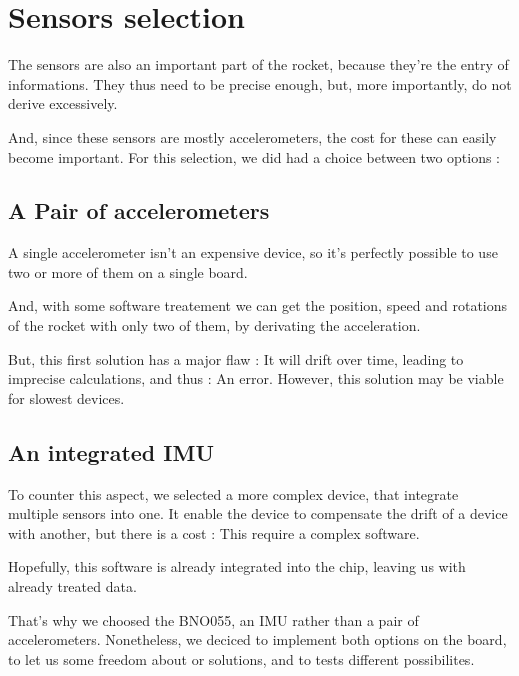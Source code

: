 \section{Sensors selection}
The sensors are also an important part of the rocket, because they're the entry
of informations. They thus need to be precise enough, but, more importantly, do
not derive excessively.

And, since these sensors are mostly accelerometers, the cost for these can
easily become important. For this selection, we did had a choice between two
options :

\subsection{A Pair of accelerometers}
A single accelerometer isn't an expensive device, so it's perfectly possible to
use two or more of them on a single board.

And, with some software treatement we can get the position, speed and rotations
of the rocket with only two of them, by derivating the acceleration.

But, this first solution has a major flaw : It will drift over time, leading to
imprecise calculations, and thus : An error. However, this solution may be
viable for slowest devices.

\subsection{An integrated IMU}
To counter this aspect, we selected a more complex device, that integrate
multiple sensors into one. It enable the device to compensate the drift of a
device with another, but there is a cost : This require a complex software.

Hopefully, this software is already integrated into the chip, leaving us with
already treated data.

That's why we choosed the BNO055, an IMU rather than a pair of accelerometers.
Nonetheless, we deciced to implement both options on the board, to let us some
freedom about or solutions, and to tests different possibilites.
